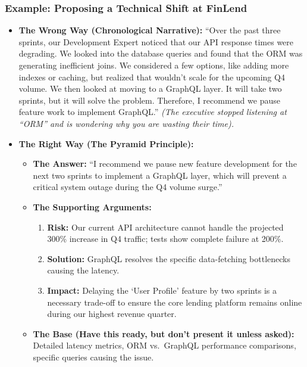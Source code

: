 \subsubsection{Example: Proposing a Technical Shift at
FinLend}\label{example-proposing-a-technical-shift-at-finlend}

\begin{itemize}
\item
  \textbf{The Wrong Way (Chronological Narrative):} ``Over the past
  three sprints, our Development Expert noticed that our API response
  times were degrading. We looked into the database queries and found
  that the ORM was generating inefficient joins. We considered a few
  options, like adding more indexes or caching, but realized that
  wouldn't scale for the upcoming Q4 volume. We then looked at moving to
  a GraphQL layer. It will take two sprints, but it will solve the
  problem. Therefore, I recommend we pause feature work to implement
  GraphQL.'' \emph{(The executive stopped listening at ``ORM'' and is
  wondering why you are wasting their time).}
\item
  \textbf{The Right Way (The Pyramid Principle):}

  \begin{itemize}
  \tightlist
  \item
    \textbf{The Answer:} ``I recommend we pause new feature development
    for the next two sprints to implement a GraphQL layer, which will
    prevent a critical system outage during the Q4 volume surge.''
  \item
    \textbf{The Supporting Arguments:}

    \begin{enumerate}
    \def\labelenumi{\arabic{enumi}.}
    \tightlist
    \item
      \textbf{Risk:} Our current API architecture cannot handle the
      projected 300\% increase in Q4 traffic; tests show complete
      failure at 200\%.
    \item
      \textbf{Solution:} GraphQL resolves the specific data-fetching
      bottlenecks causing the latency.
    \item
      \textbf{Impact:} Delaying the `User Profile' feature by two
      sprints is a necessary trade-off to ensure the core lending
      platform remains online during our highest revenue quarter.
    \end{enumerate}
  \item
    \textbf{The Base (Have this ready, but don't present it unless
    asked):} Detailed latency metrics, ORM vs.~GraphQL performance
    comparisons, specific queries causing the issue.
  \end{itemize}
\end{itemize}

